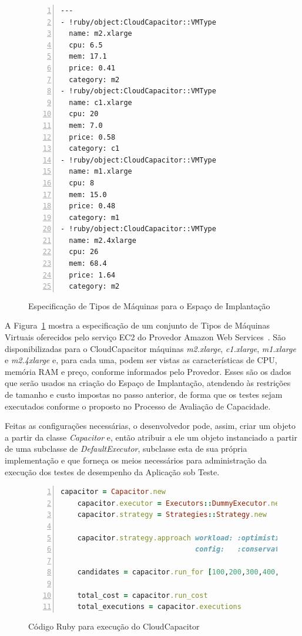 \begin{figure}[h]
 \begin{lstlisting}[linewidth=\textwidth,xleftmargin=.04\textwidth, numbers=left]
---
- !ruby/object:CloudCapacitor::VMType
  name: m2.xlarge
  cpu: 6.5
  mem: 17.1
  price: 0.41
  category: m2
- !ruby/object:CloudCapacitor::VMType
  name: c1.xlarge
  cpu: 20
  mem: 7.0
  price: 0.58
  category: c1
- !ruby/object:CloudCapacitor::VMType
  name: m1.xlarge
  cpu: 8
  mem: 15.0
  price: 0.48
  category: m1
- !ruby/object:CloudCapacitor::VMType
  name: m2.4xlarge
  cpu: 26
  mem: 68.4
  price: 1.64
  category: m2
  \end{lstlisting}
  \caption{\label{fig:depspace}Especificação de Tipos de Máquinas para o Espaço de Implantação}
\end{figure}

A Figura~\ref{fig:depspace} mostra a especificação de um conjunto de Tipos de
Máquinas Virtuais oferecidos pelo serviço EC2 do Provedor Amazon Web 
Services~\cite{ec2}. São disponibilizadas para o CloudCapacitor máquinas 
\emph{m2.xlarge}, \emph{c1.xlarge}, \emph{m1.xlarge} e \emph{m2.4xlarge} e, para
cada uma, podem ser vistas as características de CPU, memória RAM e preço, conforme
informados pelo Provedor. Esses são os dados que serão usados na criação do Espaço
de Implantação, atendendo às restrições de tamanho e custo impostas no passo 
anterior, de forma que os testes sejam executados conforme o proposto
no Processo de Avaliação de Capacidade.

Feitas as configurações necessárias, o desenvolvedor pode, assim, criar um objeto 
a partir da classe \emph{Capacitor} e, então atribuir a ele um objeto instanciado
a partir de uma subclasse de \emph{DefaultExecutor}, subclasse esta de sua própria
implementação e que forneça os meios necessários para administração da execução
dos testes de desempenho da Aplicação sob Teste.

\begin{figure}[h]
 \begin{lstlisting}[language=Ruby,linewidth=\textwidth,xleftmargin=.04\textwidth, numbers=left]
    capacitor = Capacitor.new
    capacitor.executor = Executors::DummyExecutor.new
    capacitor.strategy = Strategies::Strategy.new

    capacitor.strategy.approach workload: :optimistic,
                                config:   :conservative

    candidates = capacitor.run_for [100,200,300,400,500]
    
    total_cost = capacitor.run_cost
    total_executions = capacitor.executions  
 \end{lstlisting}
  \caption{\label{fig:mincode}Código Ruby para execução do CloudCapacitor}
\end{figure}


